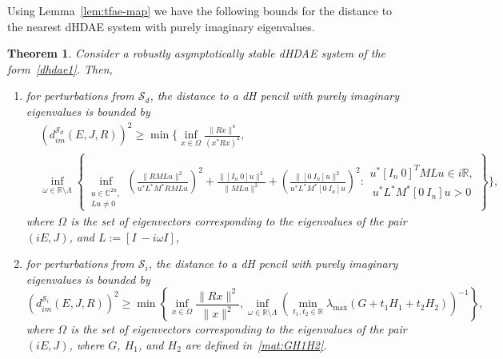 \documentclass[11pt]{article}
\newtheorem{theorem}{Theorem}
\newcommand{\R}{\mathbb R}
\newcommand{\C}{\mathbb C}
\begin{document}
Using Lemma~\ref{lem:tfae-map} we have the following bounds for the distance to the nearest dHDAE system with purely imaginary eigenvalues.
%
\begin{theorem}\label{thm:dist-imagEJR}
    Consider a robustly asymptotically stable dHDAE system of the form~\eqref{dhdae1}. Then,
    \begin{enumerate}
        \item  for  perturbations from $\mathcal S_d$, the distance to a dH pencil with purely imaginary eigenvalues
        is bounded by
        \begin{align}\label{Sd:dist-imagEJR}
            & (d_{im}^{\mathcal S_d}(E,J,R))^2\geq \min\Bigg\{ \inf_{x\in \Omega}\frac{\|Rx\|^4}{(x^*Rx)^2},\nonumber \\ & \inf_{\omega\in \R\setminus \Lambda}  \left\{\inf_{\substack{u\in\C^{2n},\\Lu\neq 0}}\left(\frac{\|RMLu\|^2}{u^*L^*M^*RMLu}\right)^2+\frac{\|[I_n~0] u\|^2}{\|MLu\|^2} + \left(\frac{\|[0~I_n] u\|^2}{u^*L^*M^*[0~I_n] u}\right)^2: \begin{matrix} u^*[I_n~0]^TMLu \in i\R,\\ ~u^*L^*M^*[0~I_n]u>0 \end{matrix} \right\}  \Bigg\},
        \end{align}
        where $\Omega$ is the set of eigenvectors corresponding to the eigenvalues of the pair $(iE,J)$, and $L:=[I~-i\omega I]$,
        \item for  perturbations from $\mathcal S_i$, the distance to a dH pencil with purely imaginary eigenvalues
        is bounded by
        \begin{equation}\label{Si:dist-imagEJR}
            (d_{im}^{\mathcal S_i}(E,J,R))^2\geq \min\left\{ \inf_{x\in \Omega}\frac{\|Rx\|^2}{\|x\|^2}, \inf_{\omega\in \R\setminus \Lambda} \left(\min_{t_1,t_2 \in \R} \lambda_{\max}(G+t_1H_1+t_2H_2) \right)^{-1} \right\},
        \end{equation}
        where $\Omega$ is the set of eigenvectors corresponding to the eigenvalues of the pair $(iE,J)$, where $G$, $H_1$, and $H_2$ are defined in~\eqref{mat:GH1H2}. %
    \end{enumerate}
\end{theorem}
\end{document}
